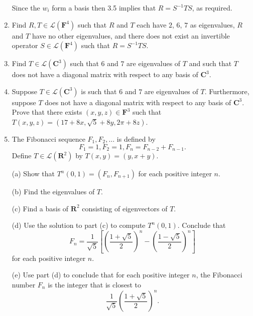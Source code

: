 \documentclass{book}
\begin{document}
\begin{enumerate}
Since the \(w_i\) form a basis then 3.5 implies that \(R=S^{-1}TS\), as required.

\item Find \(R,T \in \mathcal{L}(\textbf{F}^4)\) such that \(R\) and \(T\) each have \(2\), \(6\), \(7\) as eigenvalues, \(R\) and \(T\) have no other eigenvalues, and there does not exist an invertible operator \(S \in \mathcal{L}(\textbf{F}^4)\) such that \(R=S^{-1}TS\).

\item Find \(T \in \mathcal{L}(\textbf{C}^3)\) such that \(6\) and \(7\) are eigenvalues of \(T\) and such that \(T\) does not have a diagonal matrix with respect to any basis of \(\textbf{C}^3\).

\item Suppose \(T \in \mathcal{L}(\textbf{C}^3)\) is such that \(6\) and \(7\) are eigenvalues of \(T\).  Furthermore, suppose \(T\) does not have a diagonal matrix with respect to any basis of \(\textbf{C}^3\).  Prove that there exists \((x,y,z) \in \textbf{F}^3\) such that \(T(x,y,z)=(17+8x,\sqrt{5}+8y,2\pi+8z)\).

\item The Fibonacci sequence \(F_1,F_2,\dots\) is defined by \[F_1=1,F_2=1, F_n=F_{n-2}+F_{n-1}.\] Define \(T \in \mathcal{L}(\textbf{R}^2)\) by \(T(x,y)=(y,x+y)\).

(a) Show that \(T^n(0,1)=(F_n,F_{n+1})\) for each positive integer \(n\).

(b) Find the eigenvalues of \(T\).

(c) Find a basis of \(\textbf{R}^2\) consisting of eigenvectors of \(T\).

(d) Use the solution to part (c) to compute \(T^n(0,1)\).  Conclude that \[F_n=\frac{1}{\sqrt{5}}[(\frac{1+\sqrt{5}}{2})^n-(\frac{1-\sqrt{5}}{2})^n]\] for each positive integer \(n\).

(e) Use part (d) to conclude that for each positive integer \(n\), the Fibonacci number \(F_n\) is the integer that is closest to \[\frac{1}{\sqrt{5}}(\frac{1+\sqrt{5}}{2})^n.\]

\end{enumerate}
\end{document}
